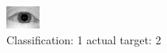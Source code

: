 \begin{figure}[h!]
\begin{center}
\includegraphics[width=0.60\columnwidth]{figures/ID923_class_1_target_2.png}
\end{center}
\caption{ Classification: 1 actual target: 2}
\label{fig:ID923_class_1_target_2}
\end{figure}

